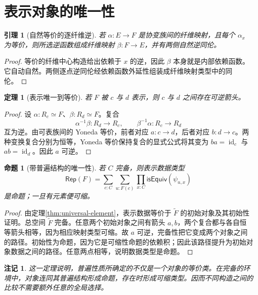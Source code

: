 \documentclass[12pt,oneside,openany,fontset=none]{ctexbook}
\theoremstyle{cn}
\newtheorem{lemma}[definition]{引理}
\newtheorem{proposition}[definition]{命题}
\newtheorem{theorem}[definition]{定理}
\newtheorem{remark}[definition]{注记}
\numberwithin{equation}{chapter}
\newcommand{\id}{\operatorname{id}}
\newcommand{\isEquiv}{\mathsf{isEquiv}}
\begin{document}
\section{表示对象的唯一性}
\begin{lemma}[自然等价的逐纤维逆]
若 $\alpha:E\to F$ 是协变族间的纤维映射，且每个 $\alpha_x$ 为等价，则所选逆函数组成纤维映射 $\beta:F\to E$，并有两侧自然逆同伦。
\end{lemma}
\begin{proof}
等价的纤维中心构造给出依赖于 $x$ 的逆，因此 $\beta$ 本身就是内部依赖函数。它自动自然。两侧逐点逆同伦经依赖函数外延性组装成纤维映射类型中的同伦。
\end{proof}
\begin{theorem}[表示唯一到等价]
若 $F$ 被 $c$ 与 $d$ 表示，则 $c$ 与 $d$ 之间存在可逆箭头。
\end{theorem}
\begin{proof}
设 $\alpha:R_c\simeq F$、$\beta:R_d\simeq F$。复合
\[
\alpha^{-1}\beta:R_d\to R_c,
\qquad
\beta^{-1}\alpha:R_c\to R_d
\]
互为逆。由可表族间的 Yoneda 等价，前者对应 $a:c\to d$，后者对应 $b:d\to c$。两种变换复合分别为恒等，Yoneda 等价保持复合的显式公式将其变为 $ba=\id_c$ 与 $ab=\id_d$。因此 $a$ 可逆。
\end{proof}
\begin{proposition}[带普遍结构的唯一性]
若 $C$ 完备，则表示数据类型
\[
\mathsf{Rep}(F)=
\sum_{c:C}\sum_{u:F(c)}
\prod_{x:C}\isEquiv(\psi_{u,x})
\]
是命题；一旦有元素便可缩。
\end{proposition}
\begin{proof}
由定理\ref{thm:universal-element}，表示数据等价于 $\widetilde F$ 的初始对象及其初始性证明。总空间 $\widetilde F$ 完备。任意两个初始对象之间有箭头 $a,b$，两个复合都与各自恒等箭头相等，因为相应映射类型可缩。故 $a$ 可逆，完备性把它变成两个对象之间的路径。初始性为命题，因为它是可缩性命题的依赖积；因此该路径提升为初始对象数据之间的路径。任意两点相等，说明数据类型是命题。
\end{proof}
\begin{remark}
这一定理说明，普遍性质所确定的不仅是一个对象的等价类。在完备的环境中，对象连同其普遍结构形成命题，存在时形成可缩类型。因而不同构造之间的比较不需要额外任意的全局选择。
\end{remark}
\end{document}
